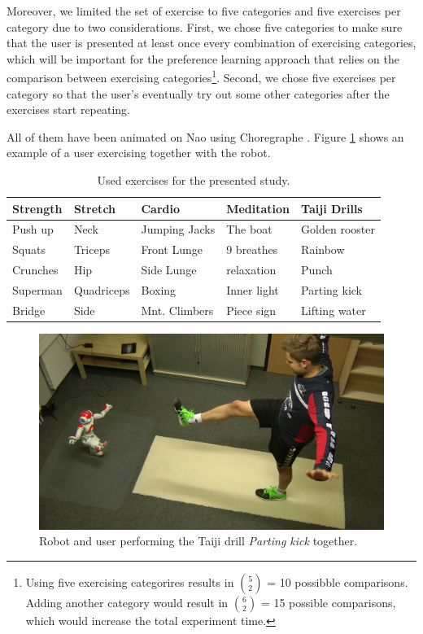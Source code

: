 \documentclass[twocolumn]{svjour3}          %
\begin{document}
Moreover, we limited the set of exercise to five categories and five exercises per category due to two considerations. 
First, we chose five categories to make sure that the user is presented at least once every combination of exercising categories, which will be important for the preference learning approach that relies on the comparison between exercising categories\footnote{Using five exercising categorires results in  ${5}\choose{2}$ = 10 possibble comparisons. Adding another category would result in ${6}\choose{2}$ = 15 possible comparisons, which would increase the total experiment time.}. Second, we chose five exercises per category so that the user's eventually try out some other categories after the exercises start repeating. 

All of them have been animated on Nao using Choregraphe
\autocite{pot2009choregraphe,gouaillier2008nao}. Figure
\ref{fig:exercises} shows an example of a user exercising together with
the robot.

\begin{center}
\begin{table} [t!]
\centering
\captionsetup{justification=centering}
\caption{Used exercises for the presented study.}\label{tab:pl:exercises}
\begin{tabular}{@{} *5l @{}}    \toprule
Strength  & Stretch & Cardio & Meditation & Taiji Drills \\ \midrule
  Push up & Neck    & Jumping Jacks & The boat & Golden rooster \\
Squats & Triceps & Front Lunge & 9 breathes & Rainbow\\
 Crunches & Hip  & Side Lunge & relaxation & Punch\\
 Superman & Quadriceps & Boxing & Inner light & Parting kick\\
 Bridge & Side  & Mnt. Climbers & Piece sign & Lifting water\\\bottomrule
\end{tabular}
\end{table}
\end{center}

\begin{figure}[h!]
\includegraphics[width=\columnwidth]{figures/taichi.png}
\caption{Robot and user performing the Taiji drill \textit{Parting kick} together.} \label{fig:exercises}
\end{figure}
\end{document}
